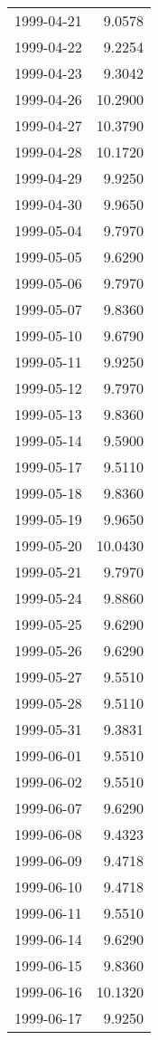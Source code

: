 \begin{tabular}{lr}
1999-04-21 &      9.0578 \\
1999-04-22 &      9.2254 \\
1999-04-23 &      9.3042 \\
1999-04-26 &     10.2900 \\
1999-04-27 &     10.3790 \\
1999-04-28 &     10.1720 \\
1999-04-29 &      9.9250 \\
1999-04-30 &      9.9650 \\
1999-05-04 &      9.7970 \\
1999-05-05 &      9.6290 \\
1999-05-06 &      9.7970 \\
1999-05-07 &      9.8360 \\
1999-05-10 &      9.6790 \\
1999-05-11 &      9.9250 \\
1999-05-12 &      9.7970 \\
1999-05-13 &      9.8360 \\
1999-05-14 &      9.5900 \\
1999-05-17 &      9.5110 \\
1999-05-18 &      9.8360 \\
1999-05-19 &      9.9650 \\
1999-05-20 &     10.0430 \\
1999-05-21 &      9.7970 \\
1999-05-24 &      9.8860 \\
1999-05-25 &      9.6290 \\
1999-05-26 &      9.6290 \\
1999-05-27 &      9.5510 \\
1999-05-28 &      9.5110 \\
1999-05-31 &      9.3831 \\
1999-06-01 &      9.5510 \\
1999-06-02 &      9.5510 \\
1999-06-07 &      9.6290 \\
1999-06-08 &      9.4323 \\
1999-06-09 &      9.4718 \\
1999-06-10 &      9.4718 \\
1999-06-11 &      9.5510 \\
1999-06-14 &      9.6290 \\
1999-06-15 &      9.8360 \\
1999-06-16 &     10.1320 \\
1999-06-17 &      9.9250 \\

\end{tabular}
